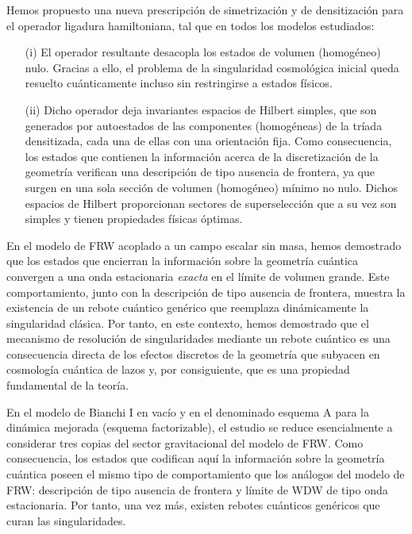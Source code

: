 \begin{list}{}{\leftmargin=1em}
 \item Hemos propuesto una nueva prescripción de simetrización y de densitización para el operador
ligadura hamiltoniana, tal que en todos los modelos estudiados:
\begin{itemize}
\item[(i)] El operador resultante desacopla los estados de volumen (homogéneo) nulo. Gracias a
ello, el problema de la singularidad cosmológica inicial queda resuelto cuánticamente incluso sin
restringirse a estados físicos.
\item[(ii)] Dicho operador deja invariantes espacios de Hilbert simples, que son generados
por autoestados de las componentes (homogéneas) de la tríada densitizada, cada una de ellas con una
orientación fija. Como consecuencia, los estados que contienen la información acerca de la
discretización de la geometría verifican una descripción de tipo {ausencia de frontera}, ya
que surgen en una sola sección de volumen (homogéneo) mínimo no nulo. Dichos espacios de
Hilbert proporcionan sectores de superselección que a su vez son simples y tienen propiedades
físicas óptimas.
\end{itemize}
\item En el modelo de FRW acoplado a un campo escalar sin masa, hemos demostrado que los estados
que encierran la información sobre la geometría cuántica convergen a una onda estacionaria
\emph{exacta} en el límite de volumen grande. Este comportamiento, junto con la descripción de tipo
{ausencia de frontera}, muestra la existencia de un rebote cuántico genérico
que reemplaza dinámicamente la singularidad clásica. Por tanto, en este contexto, hemos
demostrado que el mecanismo de resolución de singularidades
mediante un rebote cuántico es una consecuencia directa de los efectos discretos de la geometría que
subyacen en cosmología cuántica de lazos y, por consiguiente, que es una propiedad fundamental de la
teoría.
\item En el modelo de Bianchi I en vacío y en el denominado esquema A para la dinámica mejorada
(esquema factorizable),
el estudio se reduce esencialmente a considerar tres copias del sector gravitacional del modelo de
FRW. Como
consecuencia, los estados que codifican aquí la información sobre la geometría cuántica poseen el
mismo tipo de comportamiento que los análogos del modelo de FRW: descripción de tipo {ausencia
de frontera} y límite de WDW de tipo onda estacionaria. Por tanto, una vez más, existen
rebotes cuánticos genéricos que curan las singularidades.

\end{list}

